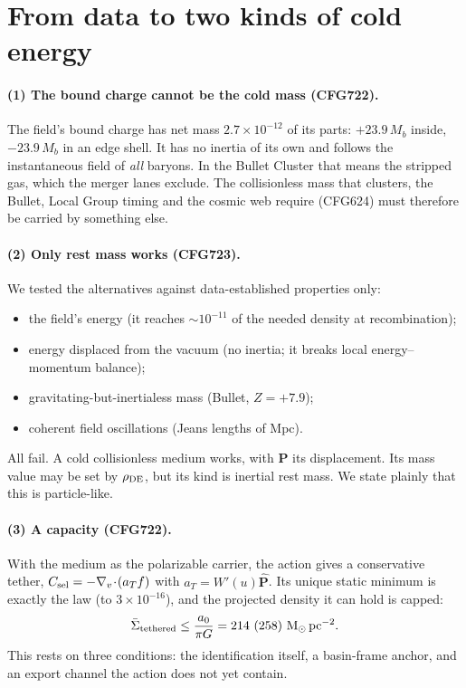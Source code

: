 \documentclass[10pt]{article}
\begin{document}
\section{From data to two kinds of cold energy}
\paragraph{(1) The bound charge cannot be the cold mass (CFG722).} The field's bound charge has net mass $2.7\times10^{-12}$ of its parts: $+23.9\,M_b$ inside, $-23.9\,M_b$ in an edge shell. It has no inertia of its own and follows the instantaneous field of \emph{all} baryons. In the Bullet Cluster that means the stripped gas, which the merger lanes exclude. The collisionless mass that clusters, the Bullet, Local Group timing and the cosmic web require (CFG624) must therefore be carried by something else.

\paragraph{(2) Only rest mass works (CFG723).} We tested the alternatives against data-established properties only:
\begin{itemize}
\item the field's energy (it reaches $\sim10^{-11}$ of the needed density at recombination);
\item energy displaced from the vacuum (no inertia; it breaks local energy--momentum balance);
\item gravitating-but-inertialess mass (Bullet, $Z=+7.9$);
\item coherent field oscillations (Jeans lengths of Mpc).
\end{itemize}
All fail. A cold collisionless medium works, with $\mathbf P$ its displacement. Its mass value may be set by $\rho_{\rm DE}$, but its kind is inertial rest mass. We state plainly that this is particle-like.

\paragraph{(3) A capacity (CFG722).} With the medium as the polarizable carrier, the action gives a conservative tether, $C_{\rm sel}=-\nabla_v\!\cdot\!(a_T f)$ with $a_T=W'(u)\hat{\mathbf P}$. Its unique static minimum is exactly the law (to $3\times10^{-16}$), and the projected density it can hold is capped:
\begin{equation}
\bar\Sigma_{\rm tethered}\le\frac{a_0}{\pi G}=214\ (258)\ {\rm M_\odot\,pc^{-2}}.
\end{equation}
This rests on three conditions: the identification itself, a basin-frame anchor, and an export channel the action does not yet contain.
\end{document}
